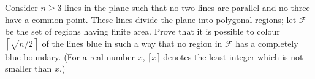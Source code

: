 Consider $n \geq 3$ lines in the plane such that no two lines are parallel and no three have a common point. These lines divide the plane into polygonal regions; let $\mathcal{F}$ be the set of regions having finite area. Prove that it is possible to colour $\left\lceil \sqrt{n/2} \right\rceil$ of the lines blue in such a way that no region in $\mathcal{F}$ has a completely blue boundary. (For a real number $x$, $\lceil x \rceil$ denotes the least integer which is not smaller than $x$.)
